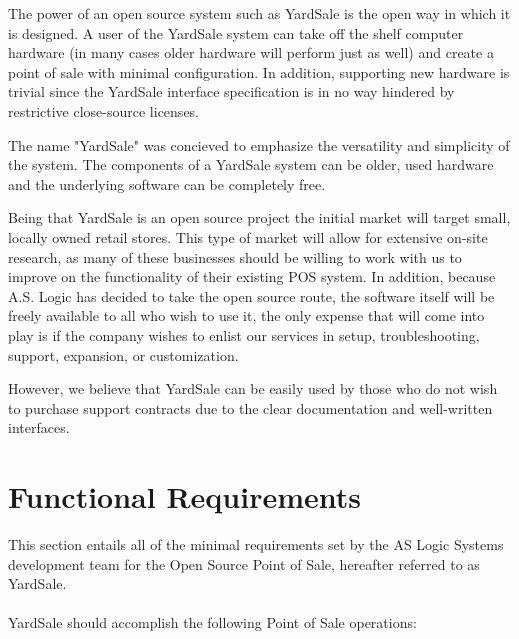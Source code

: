 \documentclass{report}
\begin{document}
        The power of an open source system such as YardSale is the
        open way in which it is designed.  A user of the YardSale system
        can take off the shelf computer hardware (in many cases older hardware
        will perform just as well) and create a point of sale with minimal
        configuration.  In addition, supporting new hardware is trivial since
        the YardSale interface specification is in no way hindered by
        restrictive close-source licenses.

        The name "YardSale" was concieved to emphasize the
        versatility and simplicity of the system.  The components of a
        YardSale system can be older, used hardware and
        the underlying software can be completely free.

        Being that YardSale is an open source project the initial
        market will target small, locally owned retail
        stores.  This type of market will allow for extensive on-site
        research, as many of these businesses should be willing to work
        with us to improve on the functionality of their existing POS
        system.  In addition, because A.S. Logic has decided to take the
        open source route, the software itself will be freely available to
        all who wish to use it, the only expense that will come into play
        is if the company wishes to enlist our services in setup,
        troubleshooting, support, expansion, or customization.

        However, we believe that YardSale can be easily used by
        those who do not wish to purchase support contracts due to
        the clear documentation and well-written interfaces.

    \section{Functional Requirements}

        This section entails all of the minimal requirements set by the AS
        Logic Systems development team for the Open Source Point of Sale, hereafter referred
        to as YardSale.\\
        \\YardSale should accomplish the following Point of Sale operations:
\end{document}
